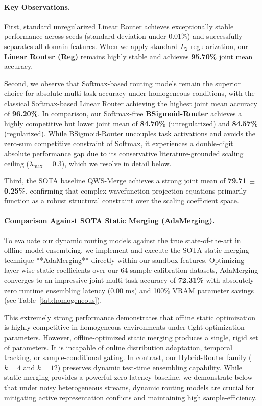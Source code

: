 \paragraph{Key Observations.}
First, standard unregularized Linear Router achieves exceptionally stable performance across seeds (standard deviation under $0.01\%$) and successfully separates all domain features. When we apply standard $L_2$ regularization, our \textbf{Linear Router (Reg)} remains highly stable and achieves \textbf{95.70\%} joint mean accuracy.

Second, we observe that Softmax-based routing models remain the superior choice for absolute multi-task accuracy under homogeneous conditions, with the classical Softmax-based Linear Router achieving the highest joint mean accuracy of \textbf{96.20\%}. In comparison, our Softmax-free \textbf{BSigmoid-Router} achieves a highly competitive but lower joint mean of \textbf{84.70\%} (unregularized) and \textbf{84.57\%} (regularized). While BSigmoid-Router uncouples task activations and avoids the zero-sum competitive constraint of Softmax, it experiences a double-digit absolute performance gap due to its conservative literature-grounded scaling ceiling ($\lambda_{\text{max}} = 0.3$), which we resolve in detail below.

Third, the SOTA baseline QWS-Merge \cite{qwsmerge} achieves a strong joint mean of \textbf{79.71 $\pm$ 0.25\%}, confirming that complex wavefunction projection equations primarily function as a robust structural constraint over the scaling coefficient space.

\paragraph{Comparison Against SOTA Static Merging (AdaMerging).}
To evaluate our dynamic routing models against the true state-of-the-art in offline model ensembling, we implement and execute the SOTA static merging technique **AdaMerging** \cite{adamerging} directly within our sandbox features. Optimizing layer-wise static coefficients over our 64-sample calibration datasets, AdaMerging converges to an impressive joint multi-task accuracy of \textbf{72.31\%} with absolutely zero runtime ensembling latency (0.00 ms) and 100\% VRAM parameter savings (see Table~\ref{tab:homogeneous}). 

This extremely strong performance demonstrates that offline static optimization is highly competitive in homogeneous environments under tight optimization parameters. However, offline-optimized static merging produces a single, rigid set of parameters. It is incapable of online distribution adaptation, temporal tracking, or sample-conditional gating. In contrast, our Hybrid-Router family ($k=4$ and $k=12$) preserves dynamic test-time ensembling capability. While static merging provides a powerful zero-latency baseline, we demonstrate below that under noisy heterogeneous streams, dynamic routing models are crucial for mitigating active representation conflicts and maintaining high sample-efficiency.

